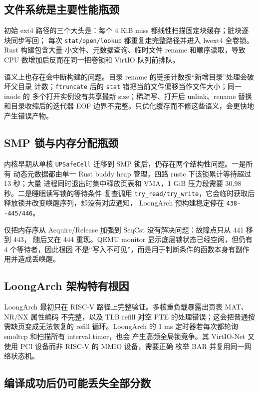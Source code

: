 \documentclass[UTF8,zihao=-4]{ctexart}
\newcommand{\code}{\nolinkurl}
\begin{document}
\subsection{文件系统是主要性能瓶颈}

初始 ext4 路径的三个大头是：每个 4 KiB miss 都线性扫描固定块缓存；脏块逐块同步写回；
每次 \code{stat/open/lookup} 都重复走完整路径并进入 lwext4 全卷锁。Rust 构建包含大量
小文件、元数据查询、临时文件 rename 和顺序读取，导致 CPU 数增加后反而在同一把卷锁和
VirtIO 队列前排队。

语义上也存在会中断构建的问题。目录 rename 的链接计数按“新增目录”处理会破坏父目录
计数；\code{ftruncate} 后的 \code{stat} 错把当前文件偏移当作文件大小；同一 inode 的
多个打开实例没有共享最新 size；稀疏写、打开后 unlink、rename 替换和目录收缩后的迭代器
EOF 边界不完整。只优化缓存而不修这些语义，会更快地产生错误产物。

\subsection{SMP 锁与内存分配瓶颈}

内核早期从单核 \code{UPSafeCell} 迁移到 SMP 锁后，仍存在两个结构性问题。一是所有
动态元数据都由单一 Rust buddy heap 管理，四路 rustc 下该锁累计等待超过 13 秒；大量
进程同时退出时集中释放页表和 VMA，1 GiB 压力段需要 30.98 秒。二是睡眠读写锁的等待条件
复查调用 \code{try_read/try_write}，它会临时获取后释放锁并改变唤醒序列，却没有对应通知，
LoongArch 预构建稳定停在 \code{438--445/446}。

仅把内存序从 Acquire/Release 加强到 SeqCst 没有解决问题：故障点只从 441 移到 443，
随后又在 444 重现。QEMU monitor 显示底层锁状态已经空闲，但仍有 4 个等待者，因此根因
不是“写入不可见”，而是用于判断条件的函数本身有副作用并造成丢唤醒。

\subsection{LoongArch 架构特有根因}

LoongArch 最初只在 RISC-V 路径上完整验证。多核重负载暴露出页表 MAT、NR/NX 属性编码
不完整，以及 TLB refill 对空 PTE 的处理错误；这会把普通按需缺页变成无法恢复的 refill
循环。LoongArch 的 1 ms 定时器若每次都轮询 smoltcp 和扫描所有 interval timer，也会
产生高频全局锁竞争。其 VirtIO-Net 又使用 PCI 设备而非 RISC-V 的 MMIO 设备，需要正确
枚举 BAR 并复用同一网络状态机。

\subsection{编译成功后仍可能丢失全部分数}
\end{document}
